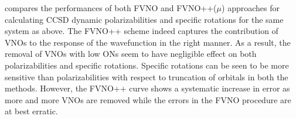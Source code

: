compares the performances of both FVNO and FVNO++($\mu$) approaches
for calculating CCSD dynamic polarizabilities and specific rotations for the same system 
as above. The FVNO++ scheme indeed captures the contribution of VNOs to
the response of the wavefunction in the right manner. As a result, the removal of VNOs with low ONs
seem to have negligible effect on both polarizabilities and specific rotations.
Specific rotations can be seen to be more sensitive than polarizabilities with respect to 
truncation of orbitals in both the methods. However, the FVNO++ curve shows a systematic 
increase in error as more and more VNOs are removed while the errors in the FVNO procedure 
are at best erratic. 

